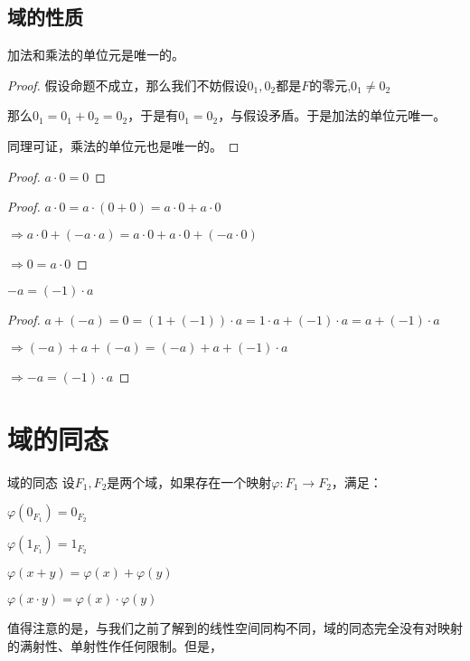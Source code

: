 \documentclass[12pt, a4paper, oneside, UTF8]{ctexbook}
\begin{document}
		\subsection{域的性质}
		\begin{para}{0}
			\point{}
				\begin{proposition}
					加法和乘法的单位元是唯一的。
				\end{proposition}
				\begin{proof}
					假设命题不成立，那么我们不妨假设$0_1,0_2$都是$F$的零元,$0_1 \neq 0_2$
					
					那么$0_1=0_1+0_2=0_2$，于是有$0_1 = 0_2$，与假设矛盾。于是加法的单位元唯一。
					
					同理可证，乘法的单位元也是唯一的。
				\end{proof}
			\point{}
				\begin{proof}
					$a\cdot 0 = 0$
				\end{proof}
				\begin{proof}
					$a \cdot 0=a\cdot (0+0)=a\cdot 0+a\cdot 0$
					
					$\Rightarrow a\cdot 0+(-a \cdot a)=a\cdot 0 + a\cdot 0+(-a\cdot 0)$
					
					$\Rightarrow 0=a \cdot 0$
				\end{proof}
			\point{}
				\begin{proposition}
					$-a = (-1)\cdot a$
				\end{proposition}
				\begin{proof}
					$a + (-a) = 0 = \left(1+ (-1)\right) \cdot a = 1 \cdot a + (-1)\cdot a=a+(-1)\cdot a$
					
					$\Rightarrow (-a)+a+(-a)=(-a)+a+(-1)\cdot a$
					
					$\Rightarrow -a = (-1)\cdot a$
				\end{proof}
		\end{para}
			
	\section{域的同态}
		\begin{defn}{域的同态}
			设$F_1,F_2$是两个域，如果存在一个映射$\varphi:F_1 \rightarrow F_2$，满足：
			
			 $\varphi (0_{F_1}) = 0_{F_2}$
			
			 $\varphi (1_{F_1}) = 1_{F_2}$
			
			 $\varphi (x+y) = \varphi (x)+\varphi (y)$
			
			 $\varphi (x\cdot y) = \varphi (x) \cdot \varphi (y)$
		\end{defn}
		值得注意的是，与我们之前了解到的线性空间同构不同，域的同态完全没有对映射的满射性、单射性作任何限制。但是，
		
\end{document}
